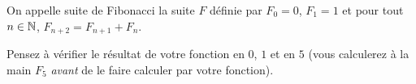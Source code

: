 {On appelle suite de Fibonacci la suite $F$ définie par
$F_{0}=0$, $F_{1}=1$ et pour tout $n\in\mathbb{N}$, $F_{n+2} = F_{n+1} + F_{n}$.}


Pensez à vérifier le résultat de votre fonction en $0$, $1$ et en $5$
(vous calculerez à la main $F_{5}$ \emph{avant} de le faire calculer
par votre fonction).